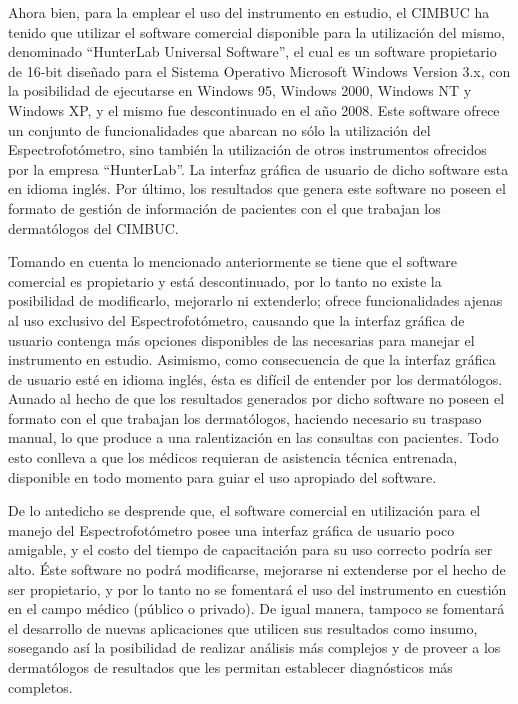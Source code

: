 Ahora bien, para la emplear el uso del instrumento en estudio, el CIMBUC ha tenido que utilizar el software comercial disponible para la utilizaci\'{o}n del mismo, denominado ``HunterLab Universal Software'', el cual es un software propietario de 16-bit dise\~{n}ado para el Sistema Operativo Microsoft Windows Version 3.x, con la posibilidad de ejecutarse en Windows 95, Windows 2000, Windows NT y Windows XP, y el mismo fue descontinuado en el a\~{n}o 2008. Este software ofrece un conjunto de funcionalidades que abarcan no s\'{o}lo la utilizaci\'{o}n del Espectrofot\'{o}metro, sino tambi\'{e}n la utilizaci\'{o}n de otros instrumentos ofrecidos por la empresa ``HunterLab''. La interfaz gr\'{a}fica de usuario de dicho software esta en idioma ingl\'{e}s. Por \'{u}ltimo, los resultados que genera este software no poseen el formato de gesti\'{o}n de informaci\'{o}n de pacientes con el que trabajan los dermat\'{o}logos del CIMBUC.

Tomando en cuenta lo mencionado anteriormente se tiene que el software comercial es propietario y est\'{a} descontinuado, por lo tanto no existe la posibilidad de modificarlo, mejorarlo ni extenderlo; ofrece funcionalidades ajenas al uso exclusivo del Espectrofot\'{o}metro, causando que la interfaz gr\'{a}fica de usuario contenga m\'{a}s opciones disponibles de las necesarias para manejar el instrumento en estudio. Asimismo, como consecuencia de que la interfaz gr\'{a}fica de usuario est\'{e} en idioma ingl\'{e}s, \'{e}sta es dif\'{i}cil de entender por los dermat\'{o}logos. Aunado al hecho de que los resultados generados por dicho software no poseen el formato con el que trabajan los dermat\'{o}logos, haciendo necesario su traspaso manual, lo que produce a una ralentizaci\'{o}n en las consultas con pacientes. Todo esto conlleva a que los m\'{e}dicos requieran de asistencia t\'{e}cnica entrenada, disponible en todo momento para guiar el uso apropiado del software.

De lo antedicho se desprende que, el software comercial en utilizaci\'{o}n para el manejo del Espectrofot\'{o}metro posee una interfaz gr\'{a}fica de usuario poco amigable, y el costo del tiempo de capacitaci\'{o}n para su uso correcto podr\'{i}a ser alto. \'{E}ste software no podr\'{a} modificarse, mejorarse ni extenderse por el hecho de ser propietario, y por lo tanto no se fomentar\'{a} el uso del instrumento en cuesti\'{o}n en el campo m\'{e}dico (p\'{u}blico o privado). De igual manera, tampoco se fomentar\'{a} el desarrollo de nuevas aplicaciones que utilicen sus resultados como insumo, sosegando as\'{i} la posibilidad de realizar an\'{a}lisis m\'{a}s complejos y de proveer a los dermat\'{o}logos de resultados que les permitan establecer diagn\'{o}sticos m\'{a}s completos.

